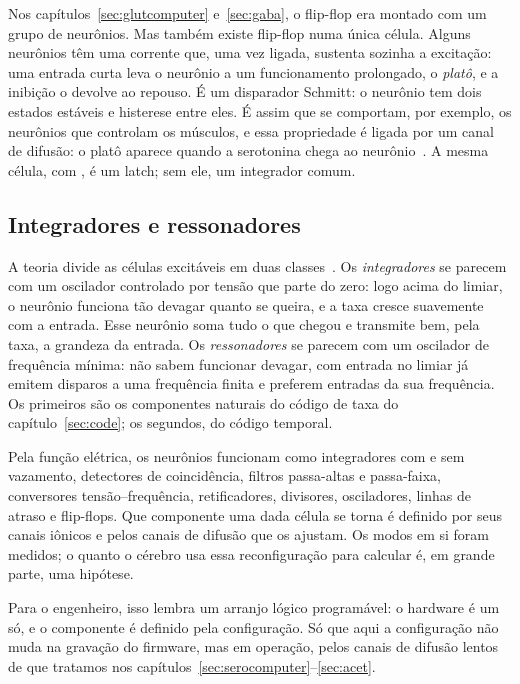 Nos capítulos~\ref{sec:glutcomputer} e~\ref{sec:gaba}, o flip-flop era montado com um grupo de neurônios. Mas também existe flip-flop numa única célula. Alguns neurônios têm uma corrente que, uma vez ligada, sustenta sozinha a excitação: uma entrada curta leva o neurônio a um funcionamento prolongado, o \emph{platô}, e a inibição o devolve ao repouso. É um disparador Schmitt: o neurônio tem dois estados estáveis e histerese entre eles. É assim que se comportam, por exemplo, os neurônios  que controlam os músculos, e essa propriedade é ligada por um canal de difusão: o platô aparece quando a serotonina chega ao neurônio~\cite{Hounsgaard1988}. A mesma célula, com , é um latch; sem ele, um integrador comum.

\subsection{Integradores e ressonadores}

A teoria divide as células excitáveis em duas classes~\cite{Izhikevich2007}. Os \emph{integradores} se parecem com um oscilador controlado por tensão que parte do zero: logo acima do limiar, o neurônio funciona tão devagar quanto se queira, e a taxa cresce suavemente com a entrada. Esse neurônio soma tudo o que chegou e transmite bem, pela taxa, a grandeza da entrada. Os \emph{ressonadores} se parecem com um oscilador de frequência mínima: não sabem funcionar devagar, com entrada no limiar já emitem disparos a uma frequência finita e preferem entradas da sua frequência. Os primeiros são os componentes naturais do código de taxa do capítulo~\ref{sec:code}; os segundos, do código temporal.

\begin{keyblock}
\begin{proposition}
\label{prop:eetypes}
Pela função elétrica, os neurônios funcionam como integradores com e sem vazamento, detectores de coincidência, filtros passa-altas e passa-faixa, conversores tensão--frequência, retificadores, divisores, osciladores, linhas de atraso e flip-flops. Que componente uma dada célula se torna é definido por seus canais iônicos e pelos canais de difusão que os ajustam. Os modos em si foram medidos; o quanto o cérebro usa essa reconfiguração para calcular é, em grande parte, uma hipótese.
\end{proposition}
\end{keyblock}

Para o engenheiro, isso lembra um arranjo lógico programável: o hardware é um só, e o componente é definido pela configuração. Só que aqui a configuração não muda na gravação do firmware, mas em operação, pelos canais de difusão lentos de que tratamos nos capítulos~\ref{sec:serocomputer}--\ref{sec:acet}.

